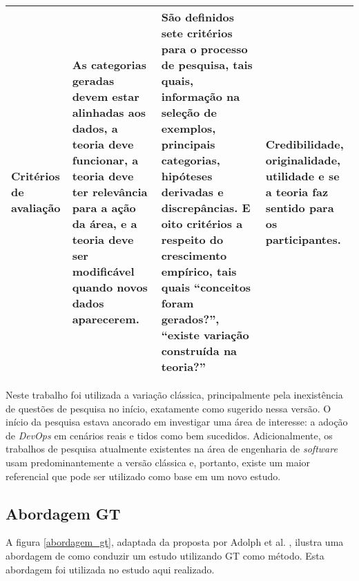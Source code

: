 \begin{table}[hb!]
{\begin{tabular}{|p{3cm}|p{5.7cm}|p{5.7cm}|p{5.7cm}|}
\textbf{Critérios de avaliação}
& As categorias geradas devem estar alinhadas aos dados, a teoria deve funcionar, a teoria deve ter relevância para a ação da área, e a teoria deve ser modificável quando novos dados aparecerem.
& São definidos sete critérios para o processo de pesquisa, tais quais, informação na seleção de exemplos, principais categorias, hipóteses derivadas e discrepâncias. E oito critérios a respeito do crescimento empírico, tais quais ``conceitos foram gerados?'', ``existe variação construída na teoria?''
& Credibilidade, originalidade, utilidade e se a teoria faz sentido para os participantes. \\
\hline

\end{tabular}}
\end{table}

Neste trabalho foi utilizada a variação clássica, principalmente pela
inexistência de questões de pesquisa no início, exatamente como
sugerido nessa versão. O início da pesquisa estava ancorado em investigar uma
área de interesse: a adoção de \textit{DevOps} em cenários reais
e tidos como bem sucedidos.
Adicionalmente, os trabalhos de pesquisa atualmente existentes na área
de engenharia de \textit{software} usam predominantemente a versão clássica
\cite{stol2016grounded} e, portanto, existe um maior referencial que pode ser
utilizado como base em um novo estudo.

\subsection{Abordagem \acrshort{GT}}\label{subsecao:abordagem_gt}

A figura \ref{abordagem_gt}, adaptada da proposta por Adolph et al.
\cite{using_gt_adolph}, ilustra uma abordagem de como conduzir um estudo
utilizando \acrshort{GT} como método. Esta abordagem foi utilizada no estudo
aqui realizado.

%

